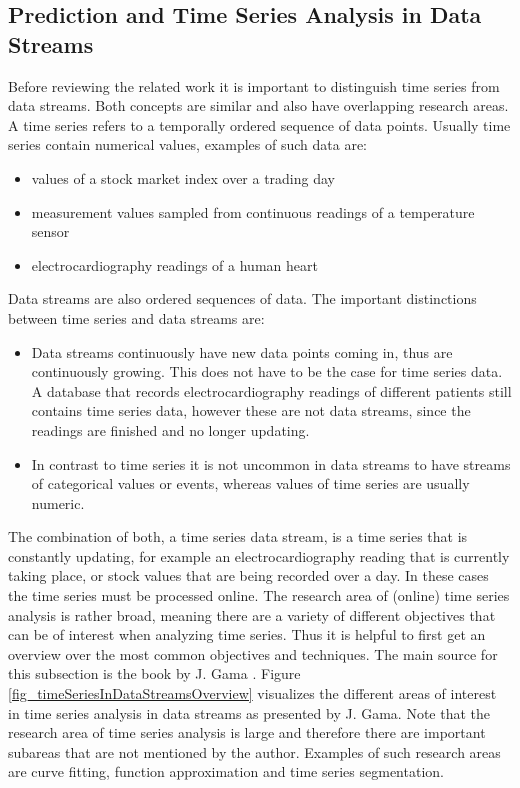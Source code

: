 \subsection{Prediction and Time Series Analysis in Data Streams}
\label{subsec_timeSeriesAnalysis}

Before reviewing the related work it is important to distinguish time series from data streams. Both concepts are similar and also have overlapping research areas. A time series refers to a temporally ordered sequence of data points. Usually time series contain numerical values, examples of such data are:

\begin{itemize}
	\item values of a stock market index over a trading day
	\item measurement values sampled from continuous readings of a temperature sensor
	\item electrocardiography readings of a human heart
\end{itemize}

Data streams are also ordered sequences of data. The important distinctions between time series and data streams are: 

\begin{itemize}
	\item Data streams continuously have new data points coming in, thus are continuously growing. This does not have to be the case for time series data. A database that records electrocardiography readings of different patients still contains time series data, however these are not data streams, since the readings are finished and no longer updating.
	\item In contrast to time series it is not uncommon in data streams to have streams of categorical values or events, whereas values of time series are usually numeric.
\end{itemize}


The combination of both, a time series data stream, is a time series that is constantly updating, for example an electrocardiography reading that is currently taking place, or stock values that are being recorded over a day. In these cases the time series must be processed online. \newline
The research area of (online) time series analysis is rather broad, meaning there are a variety of different objectives that can be of interest when analyzing time series. Thus it is helpful to first get an overview over the most common objectives and techniques. The main source for this subsection is the book by J. Gama \cite{gama2010knowledge}. Figure \ref{fig_timeSeriesInDataStreamsOverview} visualizes the different areas of interest in time series analysis in data streams as presented by J. Gama. Note that the research area of time series analysis is large and therefore there are important subareas that are not mentioned by the author. Examples of such research areas are curve fitting, function approximation and time series segmentation.

